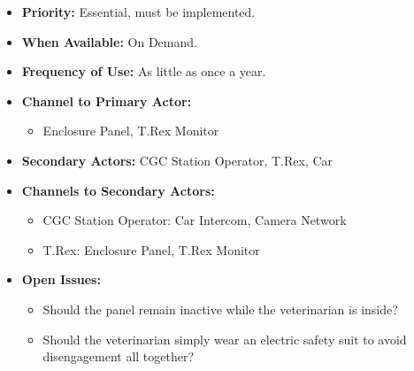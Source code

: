 \documentclass[12pt]{article}
\begin{document}
\begin{itemize}
        \item[]\textbf{Priority:}
            Essential, must be implemented.

        \item[]\textbf{When Available:}
            On Demand.

        \item[]\textbf{Frequency of Use:}
            As little as once a year.

        \item[]\textbf{Channel to Primary Actor:}
            \begin{itemize}
                \item[] Enclosure Panel, T.Rex Monitor
            \end{itemize}

        \item[]\textbf{Secondary Actors:}
            CGC Station Operator, T.Rex, Car
        
        \item[]\textbf{Channels to Secondary Actors:}
            \begin{itemize}
                \item[] CGC Station Operator: Car Intercom, Camera Network
                \item[] T.Rex: Enclosure Panel, T.Rex Monitor
            \end{itemize}

        \item[]\textbf{Open Issues:}
            \begin{itemize}
                \item[] Should the panel remain inactive while 
                the veterinarian is inside?
                \item[] Should the veterinarian simply wear an electric 
                safety suit to avoid disengagement all together?
            \end{itemize}
    \end{itemize}
    
    
    
    
\end{document}
